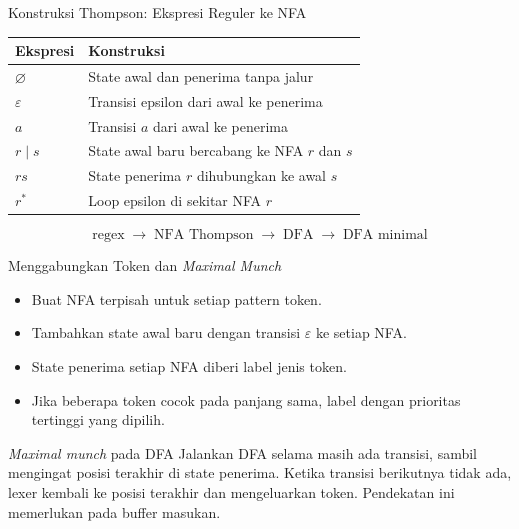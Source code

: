 \documentclass[aspectratio=169,10pt,t]{beamer}
\begin{document}
\begin{frame}{Konstruksi Thompson: Ekspresi Reguler ke NFA}
  \small
  \setlength{\tabcolsep}{4pt}
  \begin{tabular}{@{}p{3.0cm}p{10.6cm}@{}}
    \toprule
    \textbf{Ekspresi} & \textbf{Konstruksi} \\
    \midrule
    \(\varnothing\) & State awal dan penerima tanpa jalur \\
    \(\varepsilon\) & Transisi epsilon dari awal ke penerima \\
    \(a\) & Transisi \(a\) dari awal ke penerima \\
    \(r \mid s\) & State awal baru bercabang ke NFA \(r\) dan \(s\) \\
    \(rs\) & State penerima \(r\) dihubungkan ke awal \(s\) \\
    \(r^{*}\) & Loop epsilon di sekitar NFA \(r\) \\
    \bottomrule
  \end{tabular}

  \vspace{5pt}
  \[
    \text{regex} \;\to\; \text{NFA Thompson} \;\to\;
    \text{DFA} \;\to\; \text{DFA minimal}
  \]
\end{frame}

\begin{frame}{Menggabungkan Token dan \textit{Maximal Munch}}
  \begin{itemize}
    \item Buat NFA terpisah untuk setiap pattern token.
    \item Tambahkan state awal baru dengan transisi \(\varepsilon\) ke
          setiap NFA.
    \item State penerima setiap NFA diberi label jenis token.
    \item Jika beberapa token cocok pada panjang sama, label dengan
          prioritas tertinggi yang dipilih.
  \end{itemize}

  \vspace{4pt}
  \begin{block}{\textit{Maximal munch} pada DFA}
    \footnotesize
    Jalankan DFA selama masih ada transisi, sambil mengingat posisi
    terakhir di state penerima. Ketika transisi berikutnya tidak ada,
    lexer kembali ke posisi terakhir dan mengeluarkan token. Pendekatan
    ini memerlukan  pada buffer masukan.
  \end{block}
\end{frame}
\end{document}
